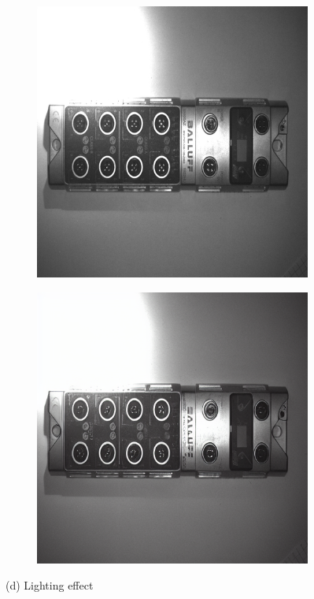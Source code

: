 \documentclass[12pt,DIV14,BCOR12mm,a4paper,footinclude=false,headinclude,parskip=half-,twoside,openright,cleardoublepage=empty,toc=index,bibliography=totoc,listof=totoc]{scrreprt}
\numberwithin{equation}{chapter}
\begin{document}
\begin{figure}\ContinuedFloat
    \centering

    \begin{subfigure}[t]{0.45\textwidth}
        \centering
        \includegraphics[width=\textwidth]{../media/diff_bni_light_real.png}
    \end{subfigure}%
    \hspace{0.02\textwidth}%
    \begin{subfigure}[t]{0.45\textwidth}
        \centering
        \includegraphics[width=\textwidth]{../media/diff_bni_light_fake.png}
    \end{subfigure}
    \caption*{(d) Lighting effect}


\end{figure}
\end{document}
